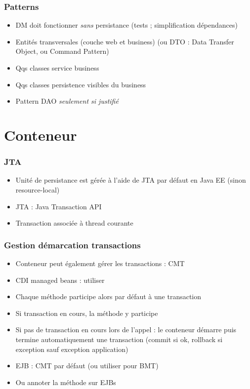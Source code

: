 \documentclass[french, english]{beamer}
\begin{document}
\begin{frame}
	\frametitle{Patterns}
	\begin{itemize}
		\item DM doit fonctionner \emph{sans} persistance (tests ;  simplification dépendances)
		\item Entités transversales (couche web et business) (ou DTO : Data Transfer Object, ou Command Pattern)
		\item Qqs classes service business
		\item Qqs classes persistence visibles du business
		\item Pattern DAO \emph{seulement si justifié}
	\end{itemize}
\end{frame}

\appendix
\section{Conteneur}
\begin{frame}
	\frametitle{JTA}
	\begin{itemize}
		\item Unité de persistance est gérée à l’aide de JTA {\tiny par défaut en Java EE (sinon \og{}resource-local\fg{})}
		\item JTA : Java Transaction API
		\item Transaction associée à thread courante
	\end{itemize}
\end{frame}

\begin{frame}
	\frametitle{Gestion démarcation transactions}
	\begin{itemize}
		\item Conteneur peut également gérer les transactions : CMT
		\item CDI managed beans : utiliser 
		\item Chaque méthode participe alors par défaut à une transaction
		\item Si transaction en cours, la méthode y participe
		\item Si pas de transaction en cours lors de l’appel : le conteneur démarre puis termine automatiquement une transaction (commit si ok, rollback si exception {\tiny sauf exception application})
		\item EJB : CMT par défaut {\tiny (ou utiliser  pour BMT)}
		\item Ou annoter la méthode  sur EJBs
	\end{itemize}
\end{frame}
\end{document}
